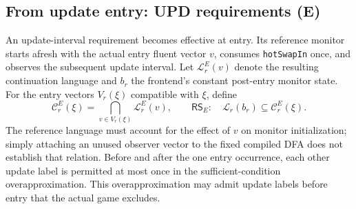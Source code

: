 \subsection{From update entry: UPD requirements (E)}
An update-interval requirement becomes effective at entry. Its reference monitor starts afresh with the actual entry fluent vector $v$, consumes \texttt{hotSwapIn} once, and observes the subsequent update interval. Let $\mathcal L_r^E(v)$ denote the resulting continuation language and $b_r$ the frontend's constant post-entry monitor state. For the entry vectors $V_r(\xi)$ compatible with $\xi$, define
\[
 \mathcal C_r^E(\xi)=\bigcap_{v\in V_r(\xi)}\mathcal L_r^E(v),
 \qquad \mathsf{RS}_E:\quad
 \mathcal L_r(b_r)\subseteq\mathcal C_r^E(\xi).
\]
The reference language must account for the effect of $v$ on monitor initialization; simply attaching an unused observer vector to the fixed compiled DFA does not establish that relation. Before and after the one entry occurrence, each other update label is permitted at most once in the sufficient-condition overapproximation. This overapproximation may admit update labels before entry that the actual game excludes.

